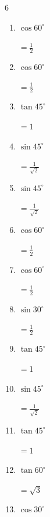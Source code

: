 \begin{multicols}{6}
\begin{enumerate}
        $\displaystyle =1$

  \item $\displaystyle \cos{60^\circ}$

        $\displaystyle =\frac{1}{2}$

  \item $\displaystyle \cos{60^\circ}$

        $\displaystyle =\frac{1}{2}$

\columnbreak %

  \item $\displaystyle \tan{45^\circ}$

        $\displaystyle =1$

  \item $\displaystyle \sin{45^\circ}$

        $\displaystyle =\frac{1}{\sqrt{2}}$

  \item $\displaystyle \sin{45^\circ}$

        $\displaystyle =\frac{1}{\sqrt{2}}$

  \item $\displaystyle \cos{60^\circ}$

        $\displaystyle =\frac{1}{2}$

  \item $\displaystyle \cos{60^\circ}$

        $\displaystyle =\frac{1}{2}$

  \item $\displaystyle \sin{30^\circ}$

        $\displaystyle =\frac{1}{2}$

  \item $\displaystyle \tan{45^\circ}$

        $\displaystyle =1$

  \item $\displaystyle \sin{45^\circ}$

        $\displaystyle =\frac{1}{\sqrt{2}}$

  \item $\displaystyle \tan{45^\circ}$

        $\displaystyle =1$

  \item $\displaystyle \tan{60^\circ}$

        $\displaystyle =\sqrt{3}$

  \item $\displaystyle \cos{30^\circ}$


\end{enumerate}
\end{multicols}
